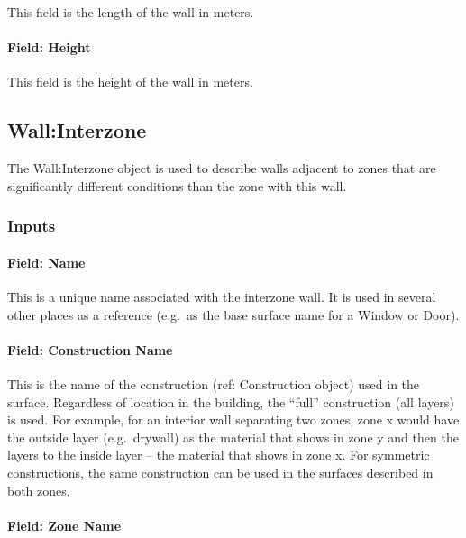 This field is the length of the wall in meters.

\paragraph{Field: Height}\label{field-height-2}

This field is the height of the wall in meters.

\subsection{Wall:Interzone}\label{wallinterzone}

The Wall:Interzone object is used to describe walls adjacent to zones that are significantly different conditions than the zone with this wall.

\subsubsection{Inputs}\label{inputs-7-028}

\paragraph{Field: Name}\label{field-name-3-033}

This is a unique name associated with the interzone wall. It is used in several other places as a reference (e.g.~as the base surface name for a Window or Door).

\paragraph{Field: Construction Name}\label{field-construction-name-3}

This is the name of the construction (ref: Construction object) used in the surface. Regardless of location in the building, the ``full'' construction (all layers) is used. For example, for an interior wall separating two zones, zone x would have the outside layer (e.g.~drywall) as the material that shows in zone y and then the layers to the inside layer -- the material that shows in zone x. For symmetric constructions, the same construction can be used in the surfaces described in both zones.

\paragraph{Field: Zone Name}\label{field-zone-name-3-006}

